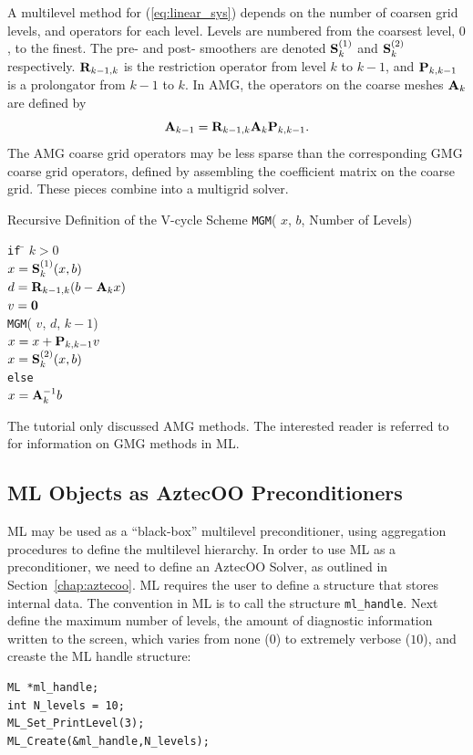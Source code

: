 A multilevel method for (\ref{eq:linear_sys}) 
depends on the number of coarsen grid levels, 
and operators for each level.
Levels are numbered from the coarsest level, $0$, to the finest.
The pre- and post- smoothers  are denoted
${\bf S}_k^{(1)}$ and ${\bf S}_k^{(2)}$ respectively.
${\bf R}_{k-1,k}$
is the restriction operator from level $k$ to $k-1$, and ${\bf P}_{k,k-1}$ is a
prolongator from $k-1$ to $k$.
In AMG, the operators on the coarse meshes ${\bf A}_k$ are defined by
\[
{\bf A}_{k-1} = {\bf R}_{k-1,k} {\bf A}_k {\bf P}_{k,k-1}.
\]
The AMG coarse grid operators may be less sparse than the corresponding GMG coarse grid operators,
defined by assembling the coefficient matrix on the coarse grid.
These pieces combine into a multigrid solver.
\begin{center}
  Recursive Definition of the V-cycle Scheme {\tt MGM}( $x$, $b$, Number
  of Levels)
\end{center}
\begin{tabbing}
{\tt if} \= $k>0$ \\
\> $x = {\bf S}_k^{(1)} (x, b)$ \\
\> $d = {\bf R}_{k-1,k}(b - {\bf A}_k x)$\\
\> $v = {\bf 0}$ \\
\> {\tt MGM}( $v$, $d$, $k-1$) \\
\> $x = x + {\bf P}_{k,k-1} v $\\
\> $x = {\bf S}_k^{(2)}( x, b )$\\
{\tt else} \\
\> $x = {\bf A}_k^{-1} b $\\
\end{tabbing}
\begin{remark}
The tutorial only discussed AMG methods.
The interested reader is referred to 
\cite{ML-home-page} for information on GMG methods
in ML.
\end{remark}
\subsection{ML Objects as AztecOO Preconditioners}
\label{sec:ml_prec}
ML may be used as a ``black-box'' multilevel preconditioner, 
using aggregation procedures to define the multilevel hierarchy. 
In order to use ML as a preconditioner, we need to define an
AztecOO Solver, as outlined in Section~\ref{chap:aztecoo}. 
ML requires the user to define a structure that stores internal data.
The convention in ML is to call the structure \verb!ml_handle!.
Next define the maximum number of levels, 
the amount of diagnostic information written to the screen, 
which varies from none ($0$) to extremely verbose ($10$), 
and creaste the ML handle structure:
\begin{verbatim}
ML *ml_handle;
int N_levels = 10;
ML_Set_PrintLevel(3);
ML_Create(&ml_handle,N_levels);
\end{verbatim}

